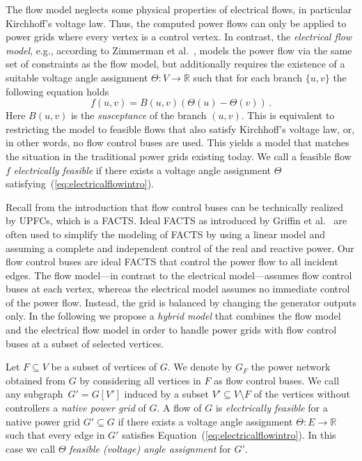 \documentclass{article}[11pt,a4paper]
\begin{document}
The flow model neglects some physical properties of electrical flows,
in particular Kirchhoff's voltage law.  Thus, the computed power
flows can only be applied to power grids where every vertex is
a control vertex.  In contrast, the \emph{electrical flow
  model}, e.g., according to Zimmerman et al.~\cite{Zimmerman2011a}, models the
power flow via the same set of constraints as the flow model, but additionally requires
the existence of a suitable voltage angle assignment $\Theta \colon V \to
\mathbb{R}$ such that for each branch $\{u,v\}$ the following equation
holds 
\begin{equation}
  \label{eq:electricalflowintro}
  f(u,v) = B(u,v) (\Theta(u) - \Theta(v))\, .  
\end{equation}
Here $B(u,v)$ is the \emph{susceptance} of the branch $(u,v)$.  This is
equivalent to restricting the model to feasible flows that also satisfy
Kirchhoff's voltage law, or, in other words, no flow control buses are used.
This yields a model that matches the situation in the traditional power grids existing today.
We call a feasible flow $f$ \emph{electrically feasible} if
there exists a voltage angle assignment $\Theta$
satisfying~(\ref{eq:electricalflowintro}).


Recall from the introduction that flow control buses can be technically realized by \mbox{UPFCs}, which is a FACTS. Ideal FACTS as introduced by Griffin et al.~\cite{julieGriffin} are often used to simplify the modeling of FACTS by using a linear model and assuming a complete and independent control of the real and reactive power. Our flow control buses are ideal FACTS that control the power flow to all incident edges. 
The flow model---in contrast to the electrical model---assumes flow control buses at each vertex, whereas the
electrical model assumes no immediate control of the power flow.  
Instead, the grid is balanced by changing
the generator outputs only.  In the following we propose a
\emph{hybrid model} that combines the flow model and the electrical flow model in order to handle power grids with flow control buses at a subset of selected vertices.

Let $F \subseteq V$ be a subset of vertices of $G$.  We denote by
$G_F$ the power network obtained from $G$ by considering all vertices in
$F$ as flow control buses.  We call any subgraph~$G' = G[V']$ induced by
a subset $V' \subseteq V \setminus F$ of the vertices without controllers a \emph{native power grid} of $G$.  A flow of $G$ is
\emph{electrically feasible} for a native power grid $G' \subseteq G$
if there exists a voltage angle assignment $\Theta \colon E \to \mathbb{R}$
such that every edge in $G'$ satisfies
Equation~(\ref{eq:electricalflowintro}).  In this case we call
$\Theta$ \emph{feasible (voltage) angle assignment} for $G'$.
\end{document}
